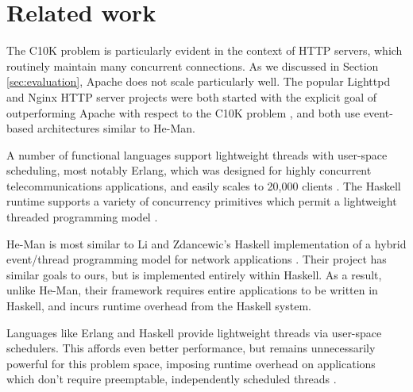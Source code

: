 \documentclass[preprint]{sigplanconf}
\begin{document}




\section{Related work}

The C10K problem is particularly evident in the context of HTTP
servers, which routinely maintain many concurrent connections. As we
discussed in Section \ref{sec:evaluation}, Apache does not scale
particularly well. The popular Lighttpd and Nginx HTTP server projects
were both started with the explicit goal of outperforming Apache with
respect to the C10K problem \cite{Lighttpd,Nginx}, and both use
event-based architectures similar to He-Man.

A number of functional languages support lightweight threads with
user-space scheduling, most notably Erlang, which was designed for
highly concurrent telecommunications applications, and easily scales
to 20,000 clients \cite{Hellstrom}. The Haskell runtime supports a
variety of concurrency primitives which permit a lightweight threaded
programming model \cite{LiEtAl}.


He-Man is most similar to Li and Zdancewic's Haskell implementation of
a hybrid event/thread programming model for network applications
\cite{LiZdancewic}.  Their project has similar goals to ours, but is
implemented entirely within Haskell. As a result, unlike He-Man, their
framework requires entire applications to be written in Haskell, and
incurs runtime overhead from the Haskell system.


Languages like Erlang and Haskell provide lightweight threads via user-space
schedulers. This affords even better performance, but remains unnecessarily
powerful for this problem space, imposing runtime overhead on applications which
don't require preemptable, independently scheduled threads \cite{Vinoski}.
\end{document}
